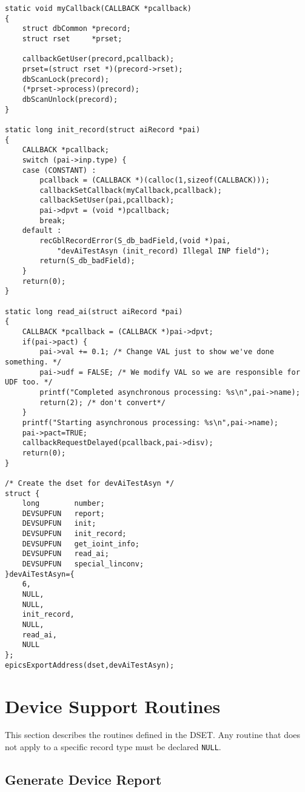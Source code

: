 \begin{verbatim}static void myCallback(CALLBACK *pcallback)
{
    struct dbCommon *precord;
    struct rset     *prset;

    callbackGetUser(precord,pcallback);
    prset=(struct rset *)(precord->rset);
    dbScanLock(precord);
    (*prset->process)(precord);
    dbScanUnlock(precord);
}

static long init_record(struct aiRecord *pai)
{
    CALLBACK *pcallback;
    switch (pai->inp.type) {
    case (CONSTANT) :
        pcallback = (CALLBACK *)(calloc(1,sizeof(CALLBACK)));
        callbackSetCallback(myCallback,pcallback);
        callbackSetUser(pai,pcallback);
        pai->dpvt = (void *)pcallback;
        break;
    default :
        recGblRecordError(S_db_badField,(void *)pai,
            "devAiTestAsyn (init_record) Illegal INP field");
        return(S_db_badField);
    }
    return(0);
}

static long read_ai(struct aiRecord *pai)
{
    CALLBACK *pcallback = (CALLBACK *)pai->dpvt;
    if(pai->pact) {
        pai->val += 0.1; /* Change VAL just to show we've done something. */
        pai->udf = FALSE; /* We modify VAL so we are responsible for UDF too. */
        printf("Completed asynchronous processing: %s\n",pai->name);
        return(2); /* don't convert*/
    } 
    printf("Starting asynchronous processing: %s\n",pai->name);
    pai->pact=TRUE;
    callbackRequestDelayed(pcallback,pai->disv);
    return(0);
}

/* Create the dset for devAiTestAsyn */
struct {
    long        number;
    DEVSUPFUN   report;
    DEVSUPFUN   init;
    DEVSUPFUN   init_record;
    DEVSUPFUN   get_ioint_info;
    DEVSUPFUN   read_ai;
    DEVSUPFUN   special_linconv;
}devAiTestAsyn={
    6,
    NULL,
    NULL,
    init_record,
    NULL,
    read_ai,
    NULL
};
epicsExportAddress(dset,devAiTestAsyn);
\end{verbatim}\section{Device Support Routines}

This section describes the routines defined in the DSET. Any routine that does not apply to a specific record type must be 
declared \verb|NULL|.

\subsection{Generate Device Report}

